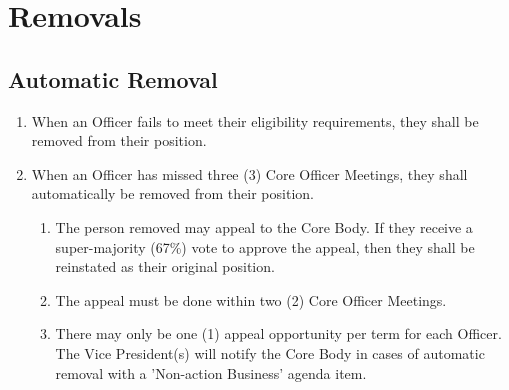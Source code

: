 \documentclass{article}
\newenvironment{li}{
\begin{enumerate}
  \setlength{\itemsep}{1pt}
  \setlength{\parskip}{0pt}
  \setlength{\parsep}{0pt}
}{\end{enumerate}}
\begin{document}
\section{Removals}
\subsection{Automatic Removal}
\begin{li}
\item When an Officer fails to meet their eligibility requirements, they shall be removed from their position.
\item When an Officer has missed three (3) Core Officer Meetings, they shall automatically be removed from their position.
	\begin{li}
	\item The person removed may appeal to the Core Body. If they receive a super-majority (67\%) vote to approve the appeal, then they shall be reinstated as their original position.
	\item The appeal must be done within two (2) Core Officer Meetings.
	\item There may only be one (1) appeal opportunity per term for each Officer. The Vice President(s) will notify the Core Body in cases of automatic removal with a 'Non-action Business' agenda item.
	\end{li}
\end{li}
\end{document}

